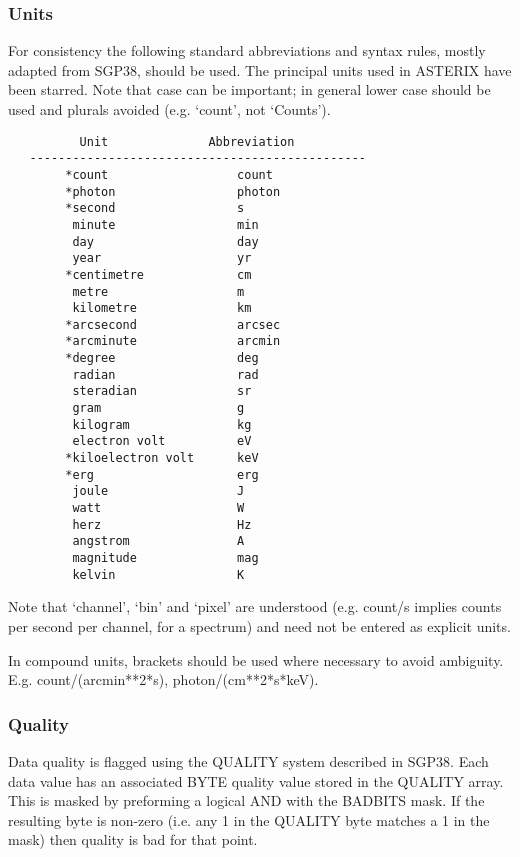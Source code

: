 \subsubsection{Units}

For consistency the  following  standard  abbreviations
and  syntax  rules,  mostly  adapted  from SGP38, should be used.  The
principal units used in ASTERIX have been starred.  Note that case can
be important; in general lower case should be used and plurals avoided
(e.g.  `count', not `Counts').

\begin{verbatim}
          Unit              Abbreviation
   -----------------------------------------------
        *count                  count
        *photon                 photon
        *second                 s
         minute                 min
         day                    day
         year                   yr
        *centimetre             cm
         metre                  m
         kilometre              km
        *arcsecond              arcsec
        *arcminute              arcmin
        *degree                 deg
         radian                 rad
         steradian              sr
         gram                   g
         kilogram               kg
         electron volt          eV
        *kiloelectron volt      keV
        *erg                    erg
         joule                  J
         watt                   W
         herz                   Hz
         angstrom               A
         magnitude              mag
         kelvin                 K
\end{verbatim}

Note that `channel', `bin' and `pixel' are understood  (e.g.   count/s
implies counts per second per channel, for a spectrum) and need not be
entered as explicit units.

In compound units, brackets should be used where  necessary  to  avoid
ambiguity.  E.g.  count/(arcmin**2*s), photon/(cm**2*s*keV).

\subsubsection{Quality}

Data quality is flagged using the QUALITY system described  in  SGP38.
Each  data  value  has  an associated BYTE quality value stored in the
QUALITY array.  This is masked by preforming a logical  AND  with  the
BADBITS  mask.   If the resulting byte is non-zero (i.e.  any 1 in the
QUALITY byte matches a 1 in the mask) then quality  is  bad  for  that
point.

